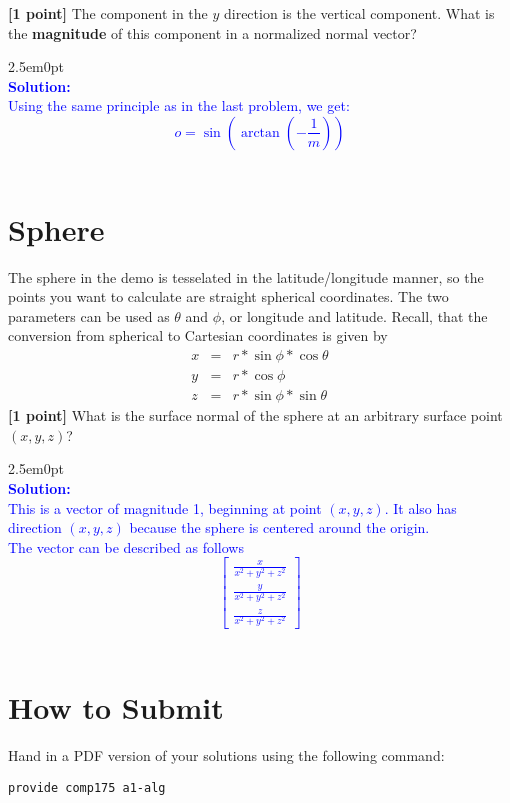 \documentclass[10pt,twocolumn]{article}
\newcommand{\solution}[1]{\begin{adjustwidth}{2.5em}{0pt}\textcolor{Blue}{\\{\bf Solution:} \\ #1}\\[5mm] \end{adjustwidth}}  %
\begin{document}
{\bf [1 point]} The component in the $y$ direction is the vertical component. What is the {\bf magnitude} of this component in a normalized normal vector?
\solution{
Using the same principle as in the last problem, we get: \[o = \sin{\left(\arctan{\left(-\frac{1}{m}\right)} \right)} \]
}

\section{Sphere}
The sphere in the demo is tesselated in the latitude/longitude manner, so the points you want to calculate are straight spherical coordinates. The two parameters can be used as $\theta$ and $\phi$, or longitude and latitude. Recall, that the conversion from spherical to Cartesian coordinates is given by
\begin{eqnarray*}
x & = & r * \sin{\phi} * \cos{\theta}\\
y & = & r * \cos{\phi}\\
z & = & r * \sin{\phi}*\sin{\theta}
\end{eqnarray*}
{\bf [1 point]} What is the surface normal of the sphere at an arbitrary surface point $(x,y,z)$?
\solution{
This is a vector of magnitude 1, beginning at point $(x, y, z)$. It also has direction $(x, y, z)$ because the sphere is centered around the origin.\\[5mm]
The vector can be described as follows
\[ \begin{bmatrix} 
  \frac{x}{x^2+y^2+z^2} \\ 
  \frac{y}{x^2+y^2+z^2} \\
  \frac{z}{x^2+y^2+z^2} 
\end{bmatrix} \]
}

\section{How to Submit}

Hand in a PDF version of your solutions using the following command:
\begin{center}
 {\tt provide comp175 a1-alg}
 \end{center}
\end{document}

